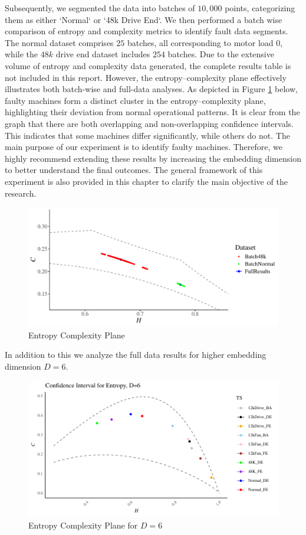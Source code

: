 Subsequently, we segmented the data into batches of $10,000$ points, categorizing them as either `Normal` or `48k Drive End`. We then performed a batch wise comparison of entropy and complexity metrics to identify fault data segments. 
The normal dataset comprises $25$ batches, all corresponding to motor load $0$, while the $48k$ drive end dataset includes $254$ batches. Due to the extensive volume of entropy and complexity data generated, the complete results table is not included in this report. However, the entropy–complexity plane effectively illustrates both batch-wise and full-data analyses. As depicted in Figure \ref{fig:EntopyComplexity Plane} below, faulty machines form a distinct cluster in the entropy–complexity plane, highlighting their deviation from normal operational patterns. 
It is clear from the graph that there are both overlapping and non-overlapping confidence intervals. This indicates that some machines differ significantly, while others do not. The main purpose of our experiment is to identify faulty machines. Therefore, we highly recommend extending these results by increasing the embedding dimension to better understand the final outcomes. The general framework of this experiment is also provided in this chapter to clarify the main objective of the research.

\begin{figure}[hbt]
	\centering
	\includegraphics[width=0.8 \textwidth]{confidence_interval}
	\caption{Entropy Complexity Plane}
	\label{fig:EntopyComplexity Plane}
\end{figure}

In addition to this we analyze the full data results for higher embedding dimension $D=6$.
	\begin{figure}[hbt]
	\centering
	\includegraphics[width=0.8 \textwidth]{Confidence Interval}
	\caption{Entropy Complexity Plane for $D=6$}
	\label{fig:EntopyComplexity Plane D=6}
\end{figure}

